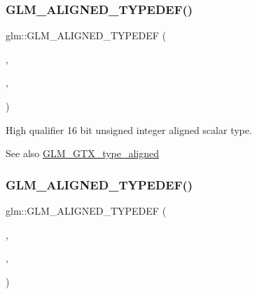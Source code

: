 \subsubsection{\texorpdfstring{G\+L\+M\+\_\+\+A\+L\+I\+G\+N\+E\+D\+\_\+\+T\+Y\+P\+E\+D\+E\+F()}{GLM\_ALIGNED\_TYPEDEF()}\hspace{0.1cm}{\footnotesize\ttfamily [94/209]}}
{\footnotesize\ttfamily glm\+::\+G\+L\+M\+\_\+\+A\+L\+I\+G\+N\+E\+D\+\_\+\+T\+Y\+P\+E\+D\+EF (\begin{DoxyParamCaption}\item[{\hyperlink{group__gtc__type__precision_ga4d32967d45ba8365e2a05eaaac85e978}{highp\+\_\+uint16}}]{,  }\item[{aligned\+\_\+highp\+\_\+uint16}]{,  }\item[{2}]{ }\end{DoxyParamCaption})}

High qualifier 16 bit unsigned integer aligned scalar type. \begin{DoxySeeAlso}{See also}
\hyperlink{group__gtx__type__aligned}{G\+L\+M\+\_\+\+G\+T\+X\+\_\+type\+\_\+aligned} 
\end{DoxySeeAlso}
\mbox{\label{group__gtx__type__aligned_ga6027ae13b2734f542a6e7beee11b8820}} 
\subsubsection{\texorpdfstring{G\+L\+M\+\_\+\+A\+L\+I\+G\+N\+E\+D\+\_\+\+T\+Y\+P\+E\+D\+E\+F()}{GLM\_ALIGNED\_TYPEDEF()}\hspace{0.1cm}{\footnotesize\ttfamily [95/209]}}
{\footnotesize\ttfamily glm\+::\+G\+L\+M\+\_\+\+A\+L\+I\+G\+N\+E\+D\+\_\+\+T\+Y\+P\+E\+D\+EF (\begin{DoxyParamCaption}\item[{\hyperlink{group__gtc__type__precision_ga3145e44c73e2df7dfe4f3cb65974bf22}{highp\+\_\+uint32}}]{,  }\item[{aligned\+\_\+highp\+\_\+uint32}]{,  }\item[{4}]{ }\end{DoxyParamCaption})}

